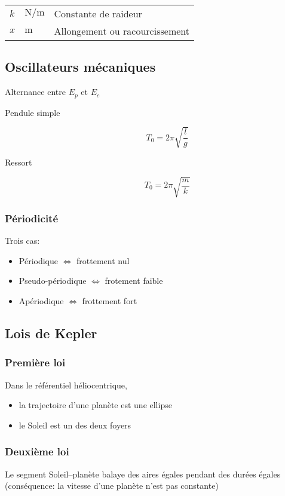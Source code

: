 \documentclass{article}
\newcommand{\deftable}[2]{%
\begin{table}[h]
    \centering
    \begin{tabular}{llp{100mm}}%
        #1
    \end{tabular}
    \label{tab:#2_units}
\end{table}%
}
\newcommand{\deftablevar}[3]{%
    $#1$ & $\si{#2}$ & #3 \\
}
\begin{document}
\deftable{
    \deftablevar{k}{\newton\per\meter}{Constante de raideur}
    \deftablevar{x}{\meter}{Allongement ou racourcissement}
}{}

\subsection{Oscillateurs mécaniques}

Alternance entre $E_p$ et $E_c$

\begin{description}
    \item[Pendule simple] $$T_0 = 2\pi \sqrt{\frac{l}{g}}$$
    \item[Ressort] $$T_0 = 2\pi \sqrt{\frac{m}{k}}$$
\end{description}

\subsubsection{Périodicité}

Trois cas:

\begin{itemize}
    \item Périodique $\iff$ frottement nul
    \item Pseudo-périodique $\iff$ frotement faible
    \item Apériodique $\iff$ frottement fort
\end{itemize}

\subsection{Lois de Kepler}

\subsubsection{Première loi}
Dans le référentiel héliocentrique, 
\begin{itemize}
    \item la trajectoire d'une planète est une ellipse 
    \item le Soleil est un des deux foyers
\end{itemize}

\subsubsection{Deuxième loi}
Le segment Soleil--planète balaye des aires égales pendant des durées égales (conséquence: la vitesse d'une planète n'est pas constante)
\end{document}
